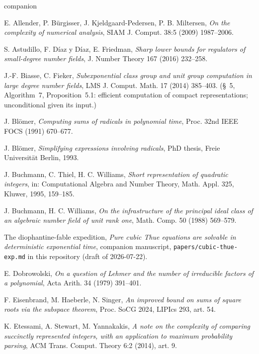 \documentclass[11pt]{amsart}
\theoremstyle{plain}
\theoremstyle{remark}
\begin{document}
\begin{thebibliography}{companion}

 E. Allender, P. B\"urgisser,
  J. Kjeldgaard-Pedersen, P. B. Miltersen, \emph{On the complexity of
  numerical analysis}, SIAM J. Comput. 38:5 (2009) 1987--2006.

 S. Astudillo, F. D\'iaz y D\'iaz, E. Friedman,
  \emph{Sharp lower bounds for regulators of small-degree number
  fields}, J. Number Theory 167 (2016) 232--258.

 J.-F. Biasse, C. Fieker, \emph{Subexponential
  class group and unit group computation in large degree number
  fields}, LMS J. Comput. Math. 17 (2014) 385--403. (\S~5,
  Algorithm~7, Proposition~5.1: efficient computation of compact
  representations; unconditional given its input.)

 J. Bl\"omer, \emph{Computing sums of radicals
  in polynomial time}, Proc. 32nd IEEE FOCS (1991) 670--677.

 J. Bl\"omer, \emph{Simplifying expressions
  involving radicals}, PhD thesis, Freie Universit\"at Berlin, 1993.

 J. Buchmann, C. Thiel, H. C. Williams,
  \emph{Short representation of quadratic integers}, in:
  Computational Algebra and Number Theory, Math. Appl. 325, Kluwer,
  1995, 159--185.

 J. Buchmann, H. C. Williams, \emph{On the
  infrastructure of the principal ideal class of an algebraic number
  field of unit rank one}, Math. Comp. 50 (1988) 569--579.

 The diophantine-fable expedition,
  \emph{Pure cubic Thue equations are solvable in deterministic
  exponential time}, companion manuscript,
  \texttt{papers/cubic-thue-exp.md} in this repository (draft of
  2026-07-22).

 E. Dobrowolski, \emph{On a question of Lehmer
  and the number of irreducible factors of a polynomial}, Acta
  Arith. 34 (1979) 391--401.

 F. Eisenbrand, M. Haeberle, N. Singer, \emph{An
  improved bound on sums of square roots via the subspace theorem},
  Proc. SoCG 2024, LIPIcs 293, art. 54.

 K. Etessami, A. Stewart, M. Yannakakis, \emph{A
  note on the complexity of comparing succinctly represented
  integers, with an application to maximum probability parsing}, ACM
  Trans. Comput. Theory 6:2 (2014), art. 9.


\end{thebibliography}
\end{document}
